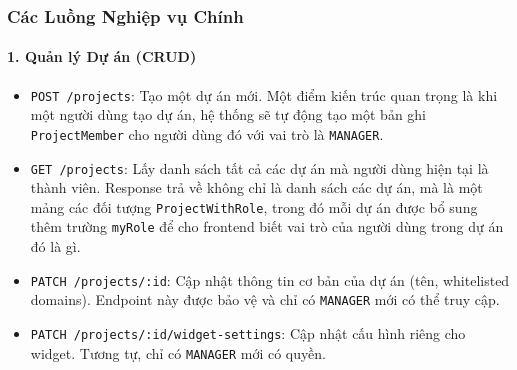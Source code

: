 \subsubsection{Các Luồng Nghiệp vụ Chính}

\paragraph{1. Quản lý Dự án (CRUD)}
\begin{itemize}
    \item \texttt{POST /projects}: Tạo một dự án mới. Một điểm kiến trúc quan trọng là khi một người dùng tạo dự án, hệ thống sẽ tự động tạo một bản ghi \texttt{ProjectMember} cho người dùng đó với vai trò là \texttt{MANAGER}.
    \item \texttt{GET /projects}: Lấy danh sách tất cả các dự án mà người dùng hiện tại là thành viên. Response trả về không chỉ là danh sách các dự án, mà là một mảng các đối tượng \texttt{ProjectWithRole}, trong đó mỗi dự án được bổ sung thêm trường \texttt{myRole} để cho frontend biết vai trò của người dùng trong dự án đó là gì.
    \item \texttt{PATCH /projects/:id}: Cập nhật thông tin cơ bản của dự án (tên, whitelisted domains). Endpoint này được bảo vệ và chỉ có \texttt{MANAGER} mới có thể truy cập.
    \item \texttt{PATCH /projects/:id/widget-settings}: Cập nhật cấu hình riêng cho widget. Tương tự, chỉ có \texttt{MANAGER} mới có quyền.
\end{itemize}


